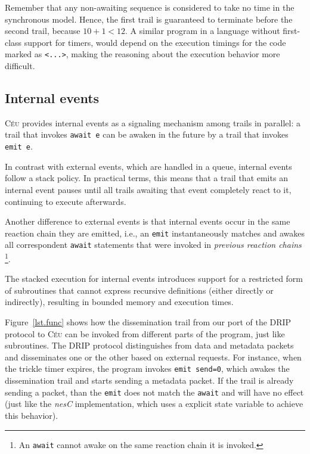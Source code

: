 \documentclass[10pt]{sensys-proc}
\newcommand{\CEU}{\textsc{C\'{e}u}\xspace}
\newcommand{\code}[1] {{\small{\texttt{#1}}}}
\begin{document}
Remember that any non-awaiting sequence is considered to take no time in the 
synchronous model.
Hence, the first trail is guaranteed to terminate before the second trail, 
because $10+1 < 12$.
A similar program in a language without first-class support for timers, would 
depend on the execution timings for the code marked as \code{<...>}, making the 
reasoning about the execution behavior more difficult.


\subsection{Internal events}
\label{sec.ceu.ints}

\CEU provides internal events as a signaling mechanism among trails in 
parallel:
a trail that invokes \code{await~e} can be awaken in the future by a trail that 
invokes \code{emit~e}.

In contrast with external events, which are handled in a queue, internal events 
follow a stack policy.
In practical terms, this means that a trail that emits an internal event pauses 
until all trails awaiting that event completely react to it, continuing to 
execute afterwards.

Another difference to external events is that internal events occur in the same 
reaction chain they are emitted, i.e., an \code{emit} instantaneously matches 
and awakes all correspondent \code{await} statements that were invoked in 
\emph{previous reaction chains}%
\footnote{An \code{await} cannot awake on the same reaction chain it is 
invoked.}.

The stacked execution for internal events introduces support for a restricted 
form of subroutines that cannot express recursive definitions (either directly 
or indirectly), resulting in bounded memory and execution times.

Figure~\ref{lst.func} shows how the dissemination trail from our port of the 
DRIP protocol to \CEU can be invoked from different parts of the program, just 
like subroutines.
The DRIP protocol distinguishes from data and metadata packets and disseminates 
one or the other based on external requests.
For instance, when the trickle timer expires, the program invokes 
\code{emit~send=0}, which awakes the dissemination trail and starts sending a 
metadata packet.
If the trail is already sending a packet, than the \code{emit} does not match 
the \code{await} and will have no effect (just like the \emph{nesC} 
implementation, which uses a explicit state variable to achieve this behavior).
\end{document}

